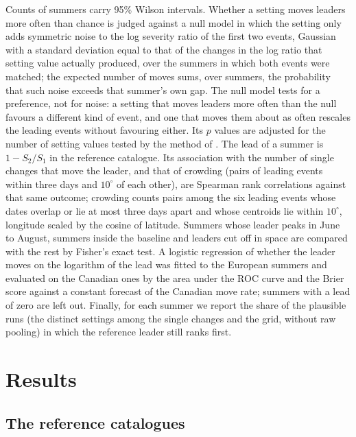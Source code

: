 \documentclass{amsdraft}
\begin{document}
Counts of summers carry 95\% Wilson intervals. Whether a setting moves
leaders more often than chance is judged against a null model in which the
setting only adds symmetric noise to the log severity ratio of the first two
events, Gaussian with a standard deviation equal to that of the changes in
the log ratio that setting value actually produced, over the summers in which
both events were matched; the expected number of moves sums, over summers,
the probability that such noise exceeds that summer's own gap. The null
model tests for a preference, not for noise: a setting that moves leaders
more often than the null favours a different kind of event, and one that
moves them about as often rescales the leading events without favouring
either. Its $p$ values are adjusted for the number of setting values tested
by the method of \citet{Holm1979}. The lead of a
summer is $1 - S_2/S_1$ in the reference catalogue. Its association with the
number of single changes that move the leader, and that of crowding (pairs
of leading events within three days and $10^\circ$ of each other), are
Spearman rank correlations against that same outcome; crowding counts pairs
among the six leading events whose dates overlap or lie at most three days
apart and whose centroids lie within $10^\circ$, longitude scaled by the
cosine of latitude. Summers whose leader peaks in June to August, summers
inside the baseline and leaders cut off in space are
compared with the rest by Fisher's exact test. A logistic regression of
whether the leader moves on the logarithm of the lead was fitted to the
European summers and evaluated on the Canadian ones by the area under the
ROC curve and the Brier score against a constant forecast of the Canadian
move rate; summers with a lead of zero are left out. Finally, for each summer
we report the share of the plausible runs (the distinct settings among the
single changes and the grid, without raw pooling) in which the reference
leader still ranks first.

\section{Results}
\label{sec:results}


\subsection{The reference catalogues}
\label{sec:cat2026}
\end{document}
